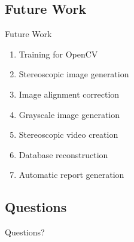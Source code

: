 \documentclass[17pt, aspectratio=169]{beamer}
\begin{document}
\subsection*{Future Work}
\begin{frame}{Future Work}
	\begin{enumerate}
		\item Training for OpenCV
		\item Stereoscopic image generation
		\item Image alignment correction
                \item Grayscale image generation
		\item Stereoscopic video creation
                \item Database reconstruction
		\item Automatic report generation
	\end{enumerate}
\end{frame}
\subsection*{Questions}
\begin{frame}
	\begin{center}
		\begin{huge}
			Questions?
		\end{huge}
	\end{center}
\end{frame}
\end{document}
